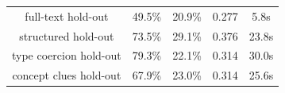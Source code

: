 \begin{figure}[t]
\begin{tabular}{|c|cccc|}
\hline
full-text hold-out & 49.5\% & 20.9\% & 0.277 & 5.8s \\

structured hold-out & 73.5\% & 29.1\% & 0.376 & 23.8s \\

type coercion hold-out & 79.3\% & 22.1\% & 0.314 & 30.0s \\

concept clues hold-out & 67.9\% & 23.0\% & 0.314 & 25.6s \\




\end{tabular}
\end{figure}
